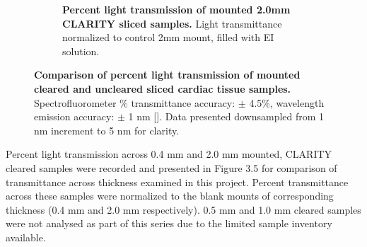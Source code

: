\begin{figure}[H]
    \begin{subfigure}[t]{0.9\textwidth}
    \centering
    \caption{\textbf{Percent light transmission of mounted 2.0mm CLARITY sliced samples.} Light transmittance normalized to control 2mm mount, filled with EI solution.}    
    \label{fig:enter-label}
    \end{subfigure}
    \medskip
    
    \caption{\textbf{Comparison of percent light transmission of mounted cleared and uncleared sliced cardiac tissue samples.}  Spectrofluorometer \% transmittance accuracy: $\pm$ 4.5\%, wavelength emission accuracy: $\pm$ 1 nm []. Data presented downsampled from 1 nm increment to 5 nm for clarity.}    
    \label{fig:enter-label}
\end{figure}

Percent light transmission across 0.4 mm and 2.0 mm mounted, CLARITY cleared samples were recorded and presented in Figure 3.5 for comparison of transmittance across thickness examined in this project. Percent transmittance across these samples were normalized to the blank mounts of corresponding thickness (0.4 mm and 2.0 mm respectively). 0.5 mm and 1.0 mm cleared samples were not analysed as part of this series due to the limited sample inventory available. 


